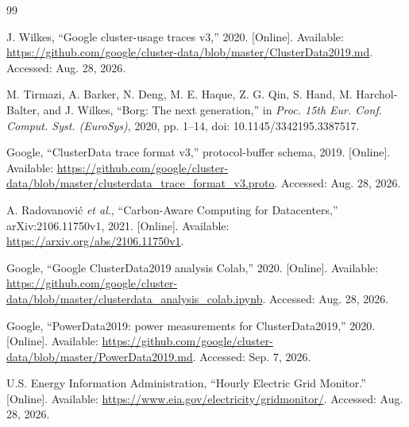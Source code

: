 \documentclass[conference]{IEEEtran}
\begin{document}
\begin{thebibliography}{99}

J. Wilkes, ``Google cluster-usage traces v3,'' 2020. [Online]. Available:
\url{https://github.com/google/cluster-data/blob/master/ClusterData2019.md}.
Accessed: Aug. 28, 2026.

M. Tirmazi, A. Barker, N. Deng, M. E. Haque, Z. G. Qin, S. Hand,
M. Harchol-Balter, and J. Wilkes, ``Borg: The next generation,'' in
\emph{Proc. 15th Eur. Conf. Comput. Syst. (EuroSys)}, 2020, pp. 1--14,
doi: 10.1145/3342195.3387517.

Google, ``ClusterData trace format v3,'' protocol-buffer schema, 2019.
[Online]. Available:
\url{https://github.com/google/cluster-data/blob/master/clusterdata_trace_format_v3.proto}.
Accessed: Aug. 28, 2026.

A. Radovanovi\'{c} \emph{et al.}, ``Carbon-Aware Computing for Datacenters,''
arXiv:2106.11750v1, 2021. [Online]. Available:
\url{https://arxiv.org/abs/2106.11750v1}.

Google, ``Google ClusterData2019 analysis Colab,'' 2020. [Online]. Available:
\url{https://github.com/google/cluster-data/blob/master/clusterdata_analysis_colab.ipynb}.
Accessed: Aug. 28, 2026.

Google, ``PowerData2019: power measurements for ClusterData2019,'' 2020.
[Online]. Available:
\url{https://github.com/google/cluster-data/blob/master/PowerData2019.md}.
Accessed: Sep. 7, 2026.

U.S. Energy Information Administration, ``Hourly Electric Grid Monitor.''
[Online]. Available: \url{https://www.eia.gov/electricity/gridmonitor/}.
Accessed: Aug. 28, 2026.

\end{thebibliography}
\end{document}

